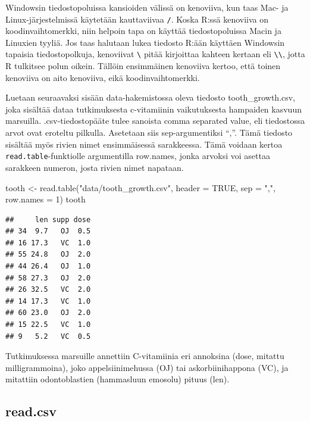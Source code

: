 \documentclass[
]{book}
\newenvironment{Shaded}{\begin{snugshade}}{\end{snugshade}}
\newcommand{\AttributeTok}[1]{\textcolor[rgb]{0.77,0.63,0.00}{#1}}
\newcommand{\ConstantTok}[1]{\textcolor[rgb]{0.00,0.00,0.00}{#1}}
\newcommand{\DecValTok}[1]{\textcolor[rgb]{0.00,0.00,0.81}{#1}}
\newcommand{\FunctionTok}[1]{\textcolor[rgb]{0.00,0.00,0.00}{#1}}
\newcommand{\NormalTok}[1]{#1}
\newcommand{\OtherTok}[1]{\textcolor[rgb]{0.56,0.35,0.01}{#1}}
\newcommand{\StringTok}[1]{\textcolor[rgb]{0.31,0.60,0.02}{#1}}
\begin{document}
Windowsin tiedostopoluissa kansioiden välissä on kenoviiva, kun taas Mac- ja Linux-järjestelmissä käytetään kauttaviivaa \texttt{/}. Koska R:ssä kenoviiva on koodinvaihtomerkki, niin helpoin tapa on käyttää tiedostopoluissa Macin ja Linuxien tyyliä. Jos taas halutaan lukea tiedosto R:ään käyttäen Windowsin tapaisia tiedostopolkuja, kenoviivat \texttt{\textbackslash{}} pitää kirjoittaa kahteen kertaan eli \texttt{\textbackslash{}\textbackslash{}}, jotta R tulkitsee polun oikein. Tällöin ensimmäinen kenoviiva kertoo, että toinen kenoviiva on aito kenoviiva, eikä koodinvaihtomerkki.

Luetaan seuraavaksi sisään data-hakemistossa oleva tiedosto tooth\_growth.csv, joka sisältää dataa tutkimuksesta c-vitamiinin vaikutuksesta hampaiden kasvuun marsuilla. .csv-tiedostopääte tulee sanoista comma separated value, eli tiedostossa arvot ovat eroteltu pilkulla. Asetetaan siis sep-argumentiksi ``,''. Tämä tiedosto sisältää myös rivien nimet ensimmäisessä sarakkeessa. Tämä voidaan kertoa \texttt{read.table}-funktiolle argumentilla row.names, jonka arvoksi voi asettaa sarakkeen numeron, josta rivien nimet napataan.

\begin{Shaded}
\begin{Highlighting}[]
\NormalTok{tooth }\OtherTok{\textless{}{-}} \FunctionTok{read.table}\NormalTok{(}\StringTok{"data/tooth\_growth.csv"}\NormalTok{, }\AttributeTok{header =} \ConstantTok{TRUE}\NormalTok{, }\AttributeTok{sep =} \StringTok{","}\NormalTok{, }\AttributeTok{row.names =} \DecValTok{1}\NormalTok{)}
\NormalTok{tooth}
\end{Highlighting}
\end{Shaded}

\begin{verbatim}
##     len supp dose
## 34  9.7   OJ  0.5
## 16 17.3   VC  1.0
## 55 24.8   OJ  2.0
## 44 26.4   OJ  1.0
## 58 27.3   OJ  2.0
## 26 32.5   VC  2.0
## 14 17.3   VC  1.0
## 60 23.0   OJ  2.0
## 15 22.5   VC  1.0
## 9   5.2   VC  0.5
\end{verbatim}

Tutkimuksessa marsuille annettiin C-vitamiinia eri annoksina (dose, mitattu milligrammoina), joko appelsiinimehussa (OJ) tai askorbiinihappona (VC), ja mitattiin odontoblastien (hammasluun emosolu) pituus (len).

\hypertarget{read.csv}{%
\subsection{read.csv}\label{read.csv}}
\end{document}
